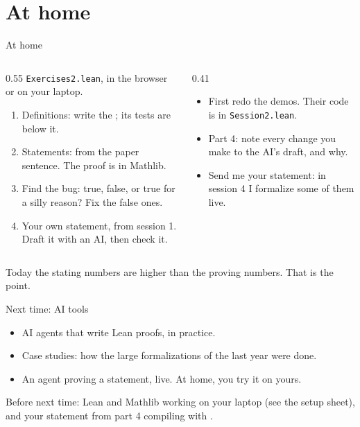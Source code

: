 \documentclass[10pt, aspectratio=169]{beamer}
\begin{document}
\section{At home}

\begin{frame}[fragile]{At home}
\begin{columns}[T]
\begin{column}{0.55\textwidth}
\texttt{Exercises2.lean}, in the browser or on your laptop.
\begin{enumerate}
\item Definitions: write the ; its tests are below it.
\item Statements: from the paper sentence. The proof is in Mathlib.
\item Find the bug: true, false, or true for a silly reason? Fix the false ones.
\item Your own statement, from session 1. Draft it with an AI, then check it.
\end{enumerate}
\end{column}
\begin{column}{0.41\textwidth}
\begin{itemize}
\item First redo the demos. Their code is in \texttt{Session2.lean}.
\item Part 4: note every change you make to the AI's draft, and why.
\item Send me your statement: in session 4 I formalize some of them live.
\end{itemize}
\end{column}
\end{columns}

\vspace{0.3em}
\begin{keypoint}
\normalsize Today the stating numbers are higher than the proving numbers. That is the point.
\end{keypoint}
\end{frame}

\begin{frame}[fragile]{Next time: AI tools}
\begin{itemize}
\item AI agents that write Lean proofs, in practice.
\item Case studies: how the large formalizations of the last year were done.
\item An agent proving a statement, live. At home, you try it on yours.
\end{itemize}

\vspace{1em}
\begin{keypoint}
\normalsize Before next time: Lean and Mathlib working on your laptop (see the setup sheet), and your statement from part 4 compiling with .
\end{keypoint}
\end{frame}
\end{document}
